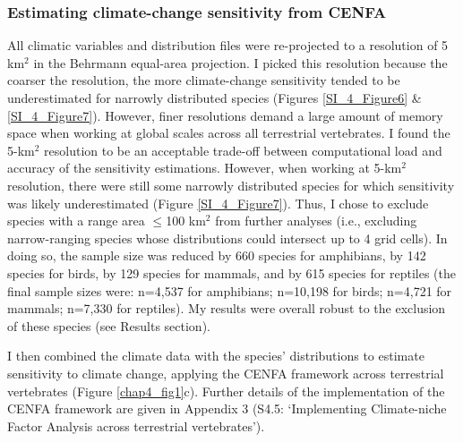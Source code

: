 \subsubsection{Estimating climate-change sensitivity from CENFA}
All climatic variables and distribution files were re-projected to a resolution of 5 km$^2$ in the Behrmann equal-area projection. I picked this resolution because the coarser the resolution, the more climate-change sensitivity tended to be underestimated for narrowly distributed species (Figures \ref{SI_4_Figure6} \& \ref{SI_4_Figure7}). However, finer resolutions demand a large amount of memory space when working at global scales across all terrestrial vertebrates. I found the 5-km$^2$ resolution to be an acceptable trade-off between computational load and accuracy of the sensitivity estimations. However, when working at 5-km$^2$ resolution, there were still some narrowly distributed species for which sensitivity was likely underestimated (Figure \ref{SI_4_Figure7}). Thus, I chose to exclude species with a range area $\leq$100 km$^2$ from further analyses (i.e., excluding narrow-ranging species whose distributions could intersect up to 4 grid cells). In doing so, the sample size was reduced by 660 species for amphibians, by 142 species for birds, by 129 species for mammals, and by 615 species for reptiles (the final sample sizes were: n=4,537 for amphibians; n=10,198 for birds; n=4,721 for mammals; n=7,330 for reptiles). My results were overall robust to the exclusion of these species (see Results section). 

I then combined the climate data with the species' distributions to estimate sensitivity to climate change, applying the CENFA framework across terrestrial vertebrates (Figure \ref{chap4_fig1}c). Further details of the implementation of the CENFA framework are given in Appendix 3 (S4.5: `Implementing Climate-niche Factor Analysis across terrestrial vertebrates').


